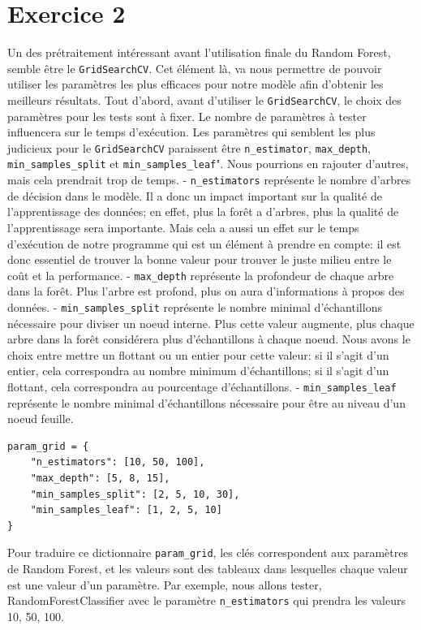 \documentclass[a4paper, 12pt, oneside]{book}
\newcounter{program}[subsection]
\begin{document}
\section{Exercice 2}
Un des prétraitement intéressant avant l'utilisation finale du Random Forest, semble être le \texttt{GridSearchCV}. Cet élément là, va nous permettre de pouvoir utiliser les paramètres les plus efficaces pour notre modèle afin d'obtenir les meilleurs résultats. Tout d'abord, avant d'utiliser le \texttt{GridSearchCV}, le choix des paramètres pour les tests sont à fixer. Le nombre de paramètres à tester influencera sur le temps d'exécution. Les paramètres qui semblent les plus judicieux pour le \texttt{GridSearchCV} paraissent être \texttt{n\_estimator}, \texttt{max\_depth}, \texttt{min\_samples\_split} et \texttt{min\_samples\_leaf}". Nous pourrions en rajouter d'autres, mais cela prendrait trop de temps. 
- \texttt{n\_estimators} représente le nombre d'arbres de décision dans le modèle. Il a donc un impact important sur la qualité de l'apprentissage des données; en effet, plus la forêt a d'arbres, plus la qualité de l'apprentissage sera importante. Mais cela a aussi un effet sur le temps d'exécution de notre programme qui est un élément à prendre en compte: il est donc essentiel de trouver la bonne valeur pour trouver le juste milieu entre le coût et la performance. 
- \texttt{max\_depth} représente la profondeur de chaque arbre dans la forêt. Plus l'arbre est profond, plus on aura d'informations à propos des données.
- \texttt{min\_samples\_split} représente le nombre minimal d'échantillons nécessaire pour diviser un noeud interne. Plus cette valeur augmente, plus chaque arbre dans la forêt considérera plus d'échantillons à chaque noeud. Nous avons le choix entre mettre un flottant ou un entier pour cette valeur: si il s'agit d'un entier, cela correspondra au nombre minimum d'échantillons; si il s'agit d'un flottant, cela correspondra au pourcentage d'échantillons.
- \texttt{min\_samples\_leaf} représente le nombre minimal d'échantillons nécessaire pour être au niveau d'un noeud feuille.
\newline
\begin{verbatim}
param_grid = {
    "n_estimators": [10, 50, 100],
    "max_depth": [5, 8, 15],
    "min_samples_split": [2, 5, 10, 30],
    "min_samples_leaf": [1, 2, 5, 10]
}
\end{verbatim}
Pour traduire ce dictionnaire \texttt{param\_grid}, les clés correspondent aux paramètres de Random Forest, et les valeurs sont des tableaux dans lesquelles chaque valeur est une valeur d'un paramètre. Par exemple, nous allons tester, RandomForestClassifier avec le paramètre \texttt{n\_estimators} qui prendra les valeurs 10, 50, 100. 
\end{document}
